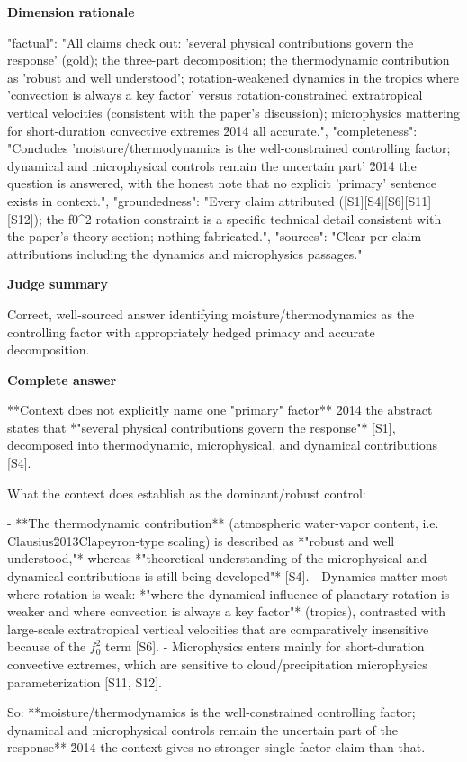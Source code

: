 \documentclass[10pt]{article}
\begin{document}
\textbf{Dimension rationale}
\begin{EvidenceText}
{
  "factual": "All claims check out: 'several physical contributions govern the response' (gold); the three-part decomposition; the thermodynamic contribution as 'robust and well understood'; rotation-weakened dynamics in the tropics where 'convection is always a key factor' versus rotation-constrained extratropical vertical velocities (consistent with the paper's discussion); microphysics mattering for short-duration convective extremes \u2014 all accurate.",
  "completeness": "Concludes 'moisture/thermodynamics is the well-constrained controlling factor; dynamical and microphysical controls remain the uncertain part' \u2014 the question is answered, with the honest note that no explicit 'primary' sentence exists in context.",
  "groundedness": "Every claim attributed ([S1][S4][S6][S11][S12]); the f0^2 rotation constraint is a specific technical detail consistent with the paper's theory section; nothing fabricated.",
  "sources": "Clear per-claim attributions including the dynamics and microphysics passages."
}
\end{EvidenceText}

\textbf{Judge summary}
\begin{EvidenceText}
Correct, well-sourced answer identifying moisture/thermodynamics as the controlling factor with appropriately hedged primacy and accurate decomposition.
\end{EvidenceText}

\textbf{Complete answer}
\begin{AnswerText}
**Context does not explicitly name one "primary" factor** \u2014 the abstract states that *"several physical contributions govern the response"* [S1], decomposed into thermodynamic, microphysical, and dynamical contributions [S4].

What the context does establish as the dominant/robust control:

- **The thermodynamic contribution** (atmospheric water-vapor content, i.e. Clausius\u2013Clapeyron-type scaling) is described as *"robust and well understood,"* whereas *"theoretical understanding of the microphysical and dynamical contributions is still being developed"* [S4].
- Dynamics matter most where rotation is weak: *"where the dynamical influence of planetary rotation is weaker and where convection is always a key factor"* (tropics), contrasted with large-scale extratropical vertical velocities that are comparatively insensitive because of the $f_0^2$ term [S6].
- Microphysics enters mainly for short-duration convective extremes, which are sensitive to cloud/precipitation microphysics parameterization [S11, S12].

So: **moisture/thermodynamics is the well-constrained controlling factor; dynamical and microphysical controls remain the uncertain part of the response** \u2014 the context gives no stronger single-factor claim than that.
\end{AnswerText}
\end{document}
